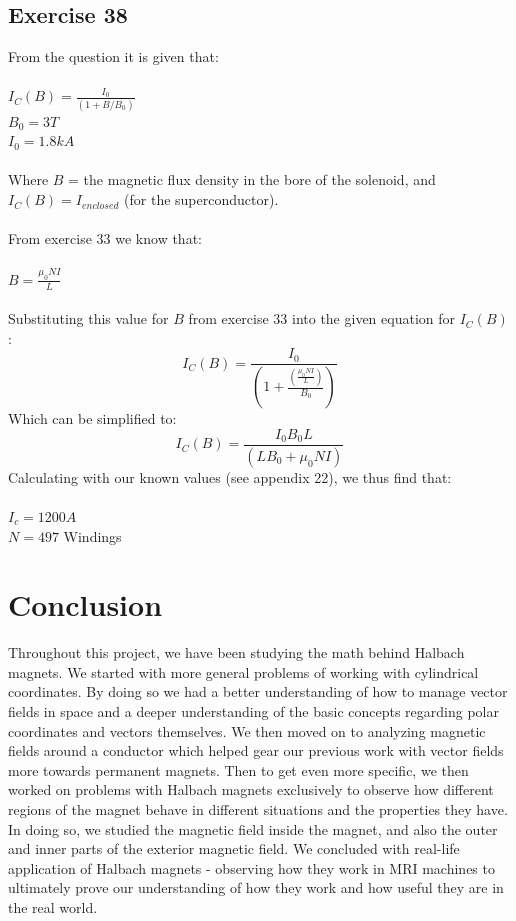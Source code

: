 \documentclass{article}
\begin{document}
\subsection{Exercise 38}
From the question it is given that:
\\
\\
$I_C(B) = \frac{I_0}{(1 + B/B_0)}$
\\
$B_{0}=3T$
\\
$I_0 = 1.8kA$
\\
\\
Where $B$ = the
magnetic flux density in the bore of the solenoid, and $I_C(B) = I_{enclosed}$ (for the superconductor).
\\
\\
From exercise 33 we know that:
\\
\\
$B=\frac{\mu_{0}\mathit{NI}}{L}$
\\
\\
Substituting this value for $B$ from exercise 33 into the given equation for $I_C(B)$:
\begin{equation}
    I_{C}\left(B\right)=\frac{I_{0}}{\left(1+\frac{\left(\frac{\mu_{0}\mathit{NI}}{L}\right)}{B_{0}}\right)}
\end{equation}
Which can be simplified to:
\begin{equation}
    I_{C}\left(B\right)=\frac{I_{0}B_{0}L}{\left(\mathit{LB}_{0}+\mu_{0}\mathit{NI}\right)}
\end{equation}
Calculating with our known values (see appendix 22), we thus find that:
\\
\\
$I_{c}= 1200A$
\\
$N = 497$ Windings
\newpage
\section{Conclusion}

Throughout this project, we have been studying the math behind Halbach magnets. We started with more general problems of working with cylindrical coordinates. By doing so we had a better understanding of how to manage vector fields in space and a deeper understanding of the basic concepts regarding polar coordinates and vectors themselves. We then moved on to analyzing magnetic fields around a conductor which helped gear our previous work with vector fields more towards permanent magnets. Then to get even more specific, we then worked on problems with Halbach magnets exclusively to observe how different regions of the magnet behave in different situations and the properties they have. In doing so, we studied the magnetic field inside the magnet, and also the outer and inner parts of the exterior magnetic field. We concluded with real-life application of Halbach magnets - observing how they work in MRI machines to ultimately prove our understanding of how they work and how useful they are in the real world.
\end{document}
